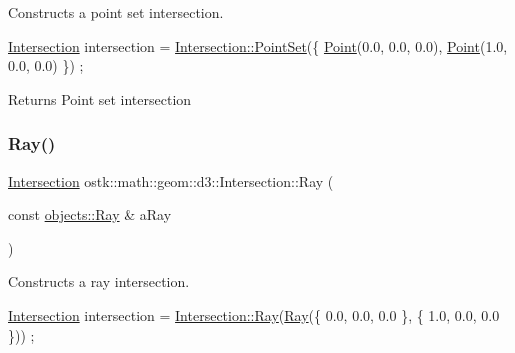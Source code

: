 Constructs a point set intersection. 


\begin{DoxyCode}
\hyperlink{classostk_1_1math_1_1geom_1_1d3_1_1_intersection_a6091ab689809d0da1e670ca18dffb2d8}{Intersection} intersection = \hyperlink{classostk_1_1math_1_1geom_1_1d3_1_1_intersection_a7304af5d2722d2ab880c728709dc11bb}{Intersection::PointSet}(\{ 
      \hyperlink{classostk_1_1math_1_1geom_1_1d3_1_1_intersection_afd86dcb53b13578098048dc5c76a9601}{Point}(0.0, 0.0, 0.0), \hyperlink{classostk_1_1math_1_1geom_1_1d3_1_1_intersection_afd86dcb53b13578098048dc5c76a9601}{Point}(1.0, 0.0, 0.0) \}) ;
\end{DoxyCode}


\begin{DoxyReturn}{Returns}
Point set intersection 
\end{DoxyReturn}
\mbox{\label{classostk_1_1math_1_1geom_1_1d3_1_1_intersection_a84c94e62ad40fb0fc94638c807978cf4}} 
\subsubsection{\texorpdfstring{Ray()}{Ray()}}
{\footnotesize\ttfamily \hyperlink{classostk_1_1math_1_1geom_1_1d3_1_1_intersection}{Intersection} ostk\+::math\+::geom\+::d3\+::\+Intersection\+::\+Ray (\begin{DoxyParamCaption}\item[{const \hyperlink{classostk_1_1math_1_1geom_1_1d3_1_1objects_1_1_ray}{objects\+::\+Ray} \&}]{a\+Ray }\end{DoxyParamCaption})\hspace{0.3cm}{\ttfamily [static]}}



Constructs a ray intersection. 


\begin{DoxyCode}
\hyperlink{classostk_1_1math_1_1geom_1_1d3_1_1_intersection_a6091ab689809d0da1e670ca18dffb2d8}{Intersection} intersection = \hyperlink{classostk_1_1math_1_1geom_1_1d3_1_1_intersection_a84c94e62ad40fb0fc94638c807978cf4}{Intersection::Ray}(\hyperlink{classostk_1_1math_1_1geom_1_1d3_1_1_intersection_a84c94e62ad40fb0fc94638c807978cf4}{Ray}(\{ 0.0, 0.0, 0.0 \}, \{ 1.0,
       0.0, 0.0 \})) ;
\end{DoxyCode}


